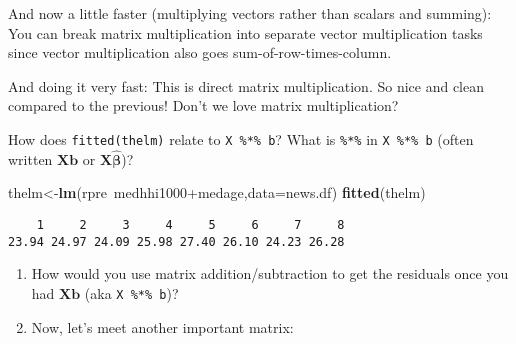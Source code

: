 \documentclass[10pt,]{article}
\newenvironment{Shaded}{\begin{snugshade}}{\end{snugshade}}
\newcommand{\KeywordTok}[1]{\textcolor[rgb]{0.13,0.29,0.53}{\textbf{{#1}}}}
\newcommand{\DataTypeTok}[1]{\textcolor[rgb]{0.13,0.29,0.53}{{#1}}}
\newcommand{\DecValTok}[1]{\textcolor[rgb]{0.00,0.00,0.81}{{#1}}}
\newcommand{\StringTok}[1]{\textcolor[rgb]{0.31,0.60,0.02}{{#1}}}
\newcommand{\CommentTok}[1]{\textcolor[rgb]{0.56,0.35,0.01}{\textit{{#1}}}}
\newcommand{\NormalTok}[1]{{#1}}
\begin{document}
And now a little faster (multiplying vectors rather than scalars and
summing): You can break matrix multiplication into separate vector
multiplication tasks since vector multiplication also goes
sum-of-row-times-column.

\begin{Shaded}
\end{Shaded}

And doing it very fast: This is direct matrix multiplication. So nice
and clean compared to the previous! Don't we love matrix multiplication?

\begin{Shaded}
\end{Shaded}

How does \texttt{fitted(thelm)} relate to \texttt{X\ \%*\%\ b}? What is
\texttt{\%*\%} in \texttt{X\ \%*\%\ b} (often written \(\bm{X} \bm{b}\)
or \(\bm{X} \hat{\bm{\beta}}\))?

\begin{Shaded}
\begin{Highlighting}[]
\NormalTok{thelm<-}\KeywordTok{lm}\NormalTok{(rpre~medhhi1000+medage,}\DataTypeTok{data=}\NormalTok{news.df)}
\KeywordTok{fitted}\NormalTok{(thelm)}
\end{Highlighting}
\end{Shaded}

\begin{verbatim}
    1     2     3     4     5     6     7     8 
23.94 24.97 24.09 25.98 27.40 26.10 24.23 26.28 
\end{verbatim}

\begin{enumerate}
\def\labelenumi{\arabic{enumi}.}
\setcounter{enumi}{3}
\item
  How would you use matrix addition/subtraction to get the residuals
  once you had \(\bm{X} \bm{b}\) (aka \texttt{X\ \%*\%\ b})?
\item
  Now, let's meet another important matrix:
\end{enumerate}
\end{document}
